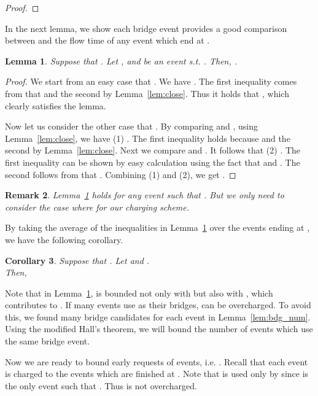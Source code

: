 \documentclass[11pt]{article}
\newtheorem{lemma}{Lemma}[section]
\newtheorem{corollary}[lemma]{Corollary}
\newtheorem{remark}[lemma]{Remark}
\begin{document}
\begin{titlepage}
\begin{proof}
\iffalse
  From (1) and (2), we
  can deduce that .
\fi
\end{proof}

In the next lemma, we show each bridge event  provides a good comparison between
 and the flow time of any event  which end at .

\begin{lemma}
  \label{lem:bdg} Suppose that . Let ,  and  be an
  event s.t. .  Then, .
\end{lemma}
\begin{proof}
  We start from an easy case that . We have
  . The first inequality comes from
  that  and
  the second by Lemma~\ref{lem:close}. Thus it holds that , which clearly satisfies the lemma.

  Now let us consider the other case that . By
  comparing  and , using Lemma~\ref{lem:close}, we
  have (1) . The first
  inequality holds because  and the second by Lemma~\ref{lem:close}. Next we compare  and . It follows that
  (2) . The first inequality can be shown by easy calculation
  using the fact that  and .
  The second follows from that . Combining (1) and (2), we get .
\end{proof}

\begin{remark}
Lemma~\ref{lem:bdg} holds for any event  such that . But we only need to
consider the case where  for our charging scheme.
\end{remark}


By taking the average of the inequalities in Lemma~\ref{lem:bdg} over the  events ending at , we have the
following corollary.

\begin{corollary}
    \label{cor:bdg}
    Suppose that . Let  and
    . \\ Then, 
\end{corollary}

Note that in Lemma~\ref{lem:bdg},  is bounded not only with  but also with , which
contributes to . If many events use  as their bridges,  can be overcharged. To avoid this, we
found many bridge candidates for each  event in Lemma~\ref{lem:bdg_num}. Using the modified Hall's theorem, we
will bound the number of events which use the same bridge event.

Now we are ready to bound early requests of  events, i.e. . Recall that each  event  is
charged to the  events which are finished at . Note that  is used only by  since
 is the only event such that . Thus  is not overcharged.



\end{titlepage}
\end{document}
